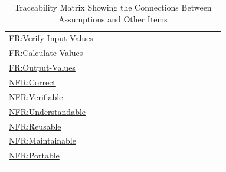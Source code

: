 \documentclass[12pt]{article}
\begin{document}
\begin{longtable}{l l l l l l l l l l l l l l l l}
\\
\hyperref[verifyInVals]{FR:Verify-Input-Values} &  &  &  &  &  &  &  &  &  &  &  &  &  &  & 
\\
\hyperref[calcValues]{FR:Calculate-Values} &  &  &  &  &  &  &  &  &  &  &  &  &  &  & 
\\
\hyperref[outputValues]{FR:Output-Values} &  &  &  &  &  &  &  &  &  &  &  &  &  &  & 
\\
\hyperref[correct]{NFR:Correct} &  &  &  &  &  &  &  &  &  &  &  &  &  &  & 
\\
\hyperref[verifiable]{NFR:Verifiable} &  &  &  &  &  &  &  &  &  &  &  &  &  &  & 
\\
\hyperref[understandable]{NFR:Understandable} &  &  &  &  &  &  &  &  &  &  &  &  &  &  & 
\\
\hyperref[reusable]{NFR:Reusable} &  &  &  &  &  &  &  &  &  &  &  &  &  &  & 
\\
\hyperref[maintainable]{NFR:Maintainable} &  &  &  &  &  &  &  &  &  &  &  &  &  &  & 
\\
\hyperref[portable]{NFR:Portable} &  &  &  &  &  &  &  &  &  &  &  &  &  &  & 
\\
\bottomrule
\caption{Traceability Matrix Showing the Connections Between Assumptions and Other Items}
\label{Table:TraceMatAvsAll}
\end{longtable}
\end{document}

